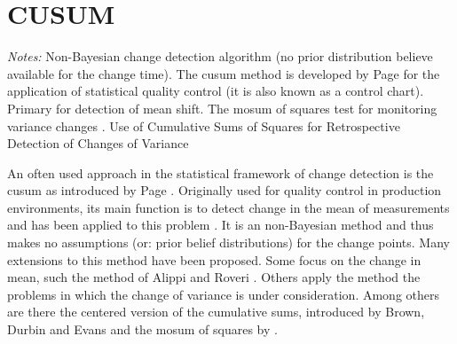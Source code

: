 \section{CUSUM}\label{cusum}




\emph{Notes:}
Non-Bayesian change detection algorithm (\ie no prior distribution believe available for the change time).
The \gls{cusum} method is developed by Page \cite{page1954continuous} for the application of statistical quality control (it is also known as a control chart).
Primary for detection of mean shift.
The \gls{mosum} of squares test for monitoring variance changes \cite{hsu2007mosum}.
Use of Cumulative Sums of Squares for Retrospective Detection of Changes of Variance \cite{inclan1994use}

An often used approach in the statistical framework of change detection is the \gls{cusum} as introduced by Page \cite{page1954continuous}.
Originally used for quality control in production environments, its main function is to detect change in the mean of measurements and has been applied to this problem \cite{basseville1993detection}.
It is an non-Bayesian method and thus makes no assumptions (or: prior belief distributions) for the change points.
Many extensions to this method have been proposed.
Some focus on the change in mean, such the method of Alippi and Roveri \cite{alippi2006adaptive}.
Others apply the method the problems in which the change of variance is under consideration.
Among others are there the centered version of the cumulative sums, introduced by Brown, Durbin and Evans \cite{brown1975techniques} and the \gls{mosum} of squares by \cite{hsu2007mosum}.

